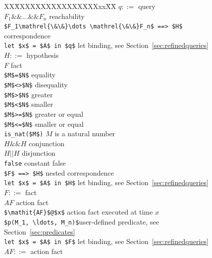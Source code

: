 \documentclass{book}
\begin{document}
\begin{figure}
\begin{center}
\begin{minipage}{\linewidth}
\begin{tabbing}
   XX\=XXXXXXXXXXXXXXXXxx\=XX\=\kill     %
$q ::=$ \>						\> query		\\
\> $F_1\mathrel{\&\&}\dots \mathrel{\&\&}F_n$	\>\> reachability\\
\> \lstinline!$F_1\mathrel{\&\&}\dots \mathrel{\&\&}F_n$ ==> $H$!\>\> correspondence \\
\> \lstinline!let $x$ = $A$ in $q$!\>\> let binding, see Section~\ref{sec:refinedqueries}\\[1.75mm]
$H ::=$ \>						\> hypothesis		\\
\> $F$							\>\> fact		\\
\> \lstinline!$M$=$N$! \>\>equality\\
\> \lstinline!$M$<>$N$! \>\>disequality\\
\> \lstinline!$M$>$N$! \>\>greater\\
\> \lstinline!$M$<$N$! \>\>smaller\\
\> \lstinline!$M$>=$N$! \>\>greater or equal\\
\> \lstinline!$M$<=$N$! \>\>smaller or equal\\
\> \lstinline!is_nat($M$)! \>\>$M$ is a natural number\\
\> $H \mathrel{\&\&} H$					\>\> conjunction 	\\
\> $H \mathrel{||} H$					\>\> disjunction 	\\
\> \lstinline!false!                                    \>\> constant false     \\
\> \lstinline!$F$ ==> $H$!				\>\> nested correspondence	\\
\> \lstinline!let $x$ = $A$ in $H$!\>\> let binding, see Section~\ref{sec:refinedqueries}\\[1.75mm]
$F ::=$ \>							\> fact\\
\> $\mathit{AF}$ \>\>action fact\\
\> \lstinline!$\mathit{AF}$@$x$! \>\>action fact executed at time $x$\\
\> \lstinline!$p(M_1, \ldots, M_n)$!\>\>user-defined predicate, see Section~\ref{sec:predicates}\\
\> \lstinline!let $x$ = $A$ in $F$!\>\> let binding, see Section~\ref{sec:refinedqueries}\\[1.75mm]
$AF ::=$ \>							\> action fact\\

\end{tabbing}
\end{minipage}
\end{center}
\end{figure}
\end{document}
